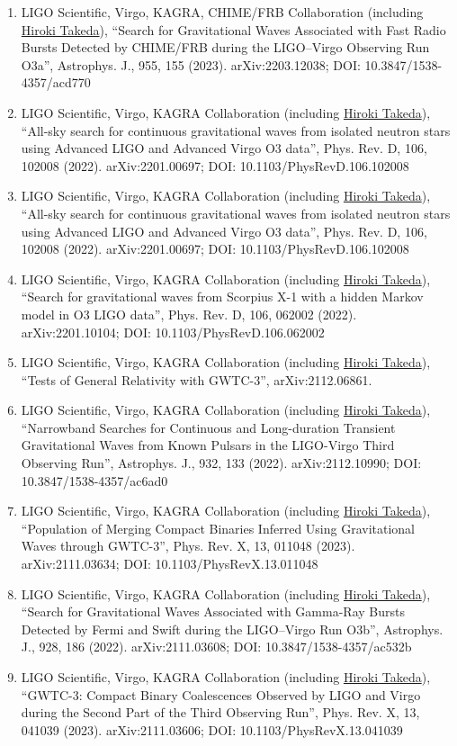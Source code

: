 \documentclass[uplatex, 12pt]{article}
\begin{document}
\begin{enumerate}
\item LIGO Scientific, Virgo, KAGRA, CHIME/FRB Collaboration (including \uline{Hiroki Takeda}), “Search for Gravitational Waves Associated with Fast Radio Bursts Detected by CHIME/FRB during the LIGO–Virgo Observing Run O3a”, Astrophys. J., 955, 155 (2023). arXiv:2203.12038; DOI: 10.3847/1538-4357/acd770
\item LIGO Scientific, Virgo, KAGRA Collaboration (including \uline{Hiroki Takeda}), “All-sky search for continuous gravitational waves from isolated neutron stars using Advanced LIGO and Advanced Virgo O3 data”, Phys. Rev. D, 106, 102008 (2022). arXiv:2201.00697; DOI: 10.1103/PhysRevD.106.102008
\item LIGO Scientific, Virgo, KAGRA Collaboration (including \uline{Hiroki Takeda}), “All-sky search for continuous gravitational waves from isolated neutron stars using Advanced LIGO and Advanced Virgo O3 data”, Phys. Rev. D, 106, 102008 (2022). arXiv:2201.00697; DOI: 10.1103/PhysRevD.106.102008
\item LIGO Scientific, Virgo, KAGRA Collaboration (including \uline{Hiroki Takeda}), “Search for gravitational waves from Scorpius X-1 with a hidden Markov model in O3 LIGO data”, Phys. Rev. D, 106, 062002 (2022). arXiv:2201.10104; DOI: 10.1103/PhysRevD.106.062002
\item LIGO Scientific, Virgo, KAGRA Collaboration (including \uline{Hiroki Takeda}), “Tests of General Relativity with GWTC-3”, arXiv:2112.06861.
\item LIGO Scientific, Virgo, KAGRA Collaboration (including \uline{Hiroki Takeda}), “Narrowband Searches for Continuous and Long-duration Transient Gravitational Waves from Known Pulsars in the LIGO-Virgo Third Observing Run”, Astrophys. J., 932, 133 (2022). arXiv:2112.10990; DOI: 10.3847/1538-4357/ac6ad0
\item LIGO Scientific, Virgo, KAGRA Collaboration (including \uline{Hiroki Takeda}), “Population of Merging Compact Binaries Inferred Using Gravitational Waves through GWTC-3”, Phys. Rev. X, 13, 011048 (2023). arXiv:2111.03634; DOI: 10.1103/PhysRevX.13.011048
\item LIGO Scientific, Virgo, KAGRA Collaboration (including \uline{Hiroki Takeda}), “Search for Gravitational Waves Associated with Gamma-Ray Bursts Detected by Fermi and Swift during the LIGO–Virgo Run O3b”, Astrophys. J., 928, 186 (2022). arXiv:2111.03608; DOI: 10.3847/1538-4357/ac532b
\item LIGO Scientific, Virgo, KAGRA Collaboration (including \uline{Hiroki Takeda}), “GWTC-3: Compact Binary Coalescences Observed by LIGO and Virgo during the Second Part of the Third Observing Run”, Phys. Rev. X, 13, 041039 (2023). arXiv:2111.03606; DOI: 10.1103/PhysRevX.13.041039

\end{enumerate}
\end{document}
